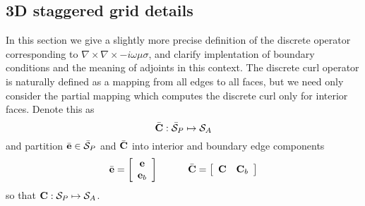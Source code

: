 \appendix

\subsection{3D staggered grid details}

In this section we give a slightly more precise definition
of the discrete operator corresponding to 
$\nabla \times \nabla \times - i \omega \mu \sigma$,
and clarify implentation of boundary conditions and the
meaning of adjoints in this context.
The discrete curl operator
is naturally defined as a mapping from 
all edges to all faces, but we need only consider the partial
mapping which computes the discrete curl
only for interior faces.  Denote this as
\begin{equation}
\bar {{\bf C}} : \bar{\cal S}_P \mapsto {\cal S}_A
\end{equation}
and partition $\bar{{\bf e}} \in \bar{\cal S}_P$
and $\bar{{\bf C}}$ into interior and boundary edge components
\begin{equation}
\bar{{\bf e}} = \left[ \begin{array}{c}
{\bf e} \\ {\bf e}_b \end{array}\right]
\,\,\,\,\,\,\,\,\,\,\,\,\,\,\,\,\,\,
\bar{{\bf C}} = \left[ \begin{array}{c c}
{\bf C} & {\bf C}_b \end{array}\right]
\end{equation}
so that ${\bf C} : {\cal S}_P \mapsto {\cal S}_A $.

